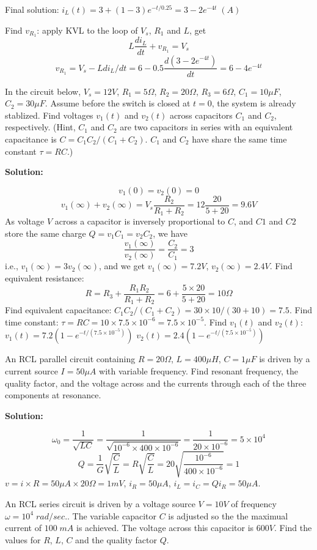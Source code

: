  Final solution:
 $i_L(t)=3+(1-3)e^{-t/0.25}=3-2 e^{-4t} \; (A)$

 Find $v_{R_1}$: apply KVL to the loop of $V_s$, $R_1$ and $L$, get
 \[ L\frac{di_L}{dt}+v_{R_1}=V_s	\]
 \[ v_{R_1}=V_s-L di_L/dt=6-0.5 \frac{d(3-2 e^{-4t})}{dt}=6-4e^{-4t}	\]

\item In the circuit below, $V_s=12V$, $R_1=5\Omega$, $R_2=20\Omega$,
$R_3=6\Omega$, $C_1=10\mu F$, $C_2=30\mu F$. Assume before the switch 
is closed at $t=0$, the system is already stablized. Find voltages
$v_1(t)$ and $v_2(t)$ across capacitors $C_1$ and $C_2$, respectively.
(Hint, $C_1$ and $C_2$ are two capacitors in series with an equivalent
capacitance is $C=C_1 C_2/(C_1+C_2)$. $C_1$ and $C_2$ have share the same
time constant $\tau=RC$.)


{\bf Solution:}

 \[ v_1(0)=v_2(0)=0	\]
 \[ v_1(\infty)+v_2(\infty)=V_s \frac{R_2}{R_1+R_2}
 	=12 \frac{20}{5+20}=9.6V	\]
 As voltage $V$ across a capacitor is inversely proportional to $C$, and 
 $C1$ and $C2$ store the same charge $Q=v_1C_1=v_2C_2$, we have
 \[	\frac{v_1(\infty)}{v_2(\infty)}=\frac{C_2}{C_1}=3	\]
 i.e., $v_1(\infty)=3v_2(\infty)$, and we get $v_1(\infty)=7.2V$,
 $v_2(\infty)=2.4V$.
 Find equivalent resistance: 
 \[ R=R_3+\frac{R_1 R_2}{R_1+R_2}=6+\frac{5\times 20}{5+20}=10\Omega \]
 Find equivalent capacitance: $C_1 C_2/(C_1+C_2)=30\times 10/(30+10)=7.5$. 
 Find time constant: $\tau=RC=10\times 7.5\times 10^{-6}=7.5\times 10^{-5}$.
 Find $v_1(t)$ and $v_2(t)$:
 $v_1(t)=7.2(1-e^{-t/(7.5\times 10^{-5})})$
 $v_2(t)=2.4(1-e^{-t/(7.5\times 10^{-5})})$

\item An RCL parallel circuit containing $R=20\Omega$, $L=400 \mu H$,
$C=1 \mu F$ is driven by a current source $I=50 \mu A$ with variable 
frequency. Find resonant frequency, the quality factor, and the voltage
across and the currents through each of the three components at resonance.

{\bf Solution:}

 \[ \omega_0=\frac{1}{\sqrt{LC}}=\frac{1}{\sqrt{10^{-6}\times 400 \times 10^{-6}}}
 	=\frac{1}{20 \times 10^{-6}}=5 \times 10^4	\]
 \[ Q=\frac{1}{G}\sqrt{\frac{C}{L}}=R\sqrt{\frac{C}{L}}
 =20\sqrt{\frac{10^{-6}}{400\times 10^{-6}}}=1	\]
 $v=i\times R=50 \mu A \times 20 \Omega=1 mV$, $i_R=50 \mu A$,
 $i_L=i_C=Q i_R=50 \mu A$.
 
 
\item An RCL series circuit is driven by a voltage source $V=10V$ of
frequency $\omega=10^4 \;rad/sec.$. The variable capacitor $C$ is
adjusted so the the maximual current of $100\;mA$ is achieved. The
voltage across this capacitor is $600V$. Find the values for $R$, $L$,
$C$ and the quality factor $Q$.

